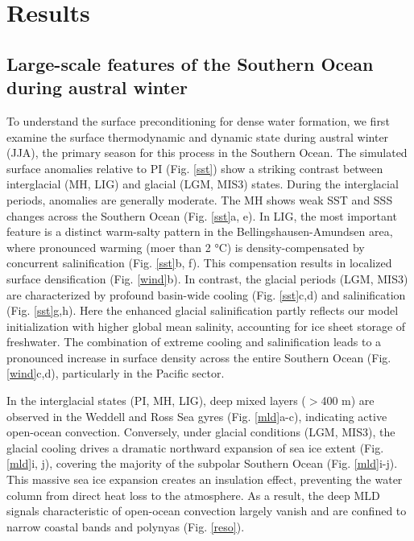 \documentclass[pdflatex,sn-nature]{sn-jnl}
\begin{document}


\section{Results}

\subsection{Large-scale features of the Southern Ocean during austral winter}


To understand the surface preconditioning for dense water formation, we first examine the surface thermodynamic and dynamic state during austral winter (JJA), the primary season for this process in the Southern Ocean. %
The simulated surface anomalies relative to PI (Fig. \ref{sst}) show a striking contrast between interglacial (MH, LIG) and glacial (LGM, MIS3) states. During the interglacial periods, anomalies are generally moderate. The MH shows weak SST and SSS changes across the Southern Ocean (Fig. \ref{sst}a, e). In LIG, the most important feature is a distinct warm-salty pattern in the Bellingshausen-Amundsen area, where pronounced warming (moer than 2 °C) is density-compensated by concurrent salinification (Fig. \ref{sst}b, f). This compensation results in localized surface densification (Fig. \ref{wind}b).
In  contrast, the glacial periods (LGM, MIS3) are characterized by profound basin-wide cooling (Fig. \ref{sst}c,d) and salinification (Fig. \ref{sst}g,h). Here the enhanced glacial salinification partly reflects our model initialization with higher global mean salinity, accounting for ice sheet storage of freshwater. The combination of extreme cooling and salinification leads to a pronounced increase in surface density across the entire Southern Ocean (Fig. \ref{wind}c,d), particularly in the Pacific sector.




In the interglacial states (PI, MH, LIG),  deep mixed layers ($>$400 m) are observed in the Weddell and Ross Sea gyres (Fig. \ref{mld}a-c), indicating active open-ocean convection. Conversely, under glacial conditions (LGM, MIS3), the glacial cooling drives a dramatic northward expansion of sea ice extent (Fig. \ref{mld}i, j), covering the majority of the subpolar Southern Ocean (Fig. \ref{mld}i-j). This massive sea ice expansion creates an insulation effect, preventing the water column from direct heat loss to the atmosphere. As a result, the deep MLD signals characteristic of open-ocean convection largely vanish and are confined to narrow coastal bands and polynyas (Fig. \ref{reso}). %
\end{document}
